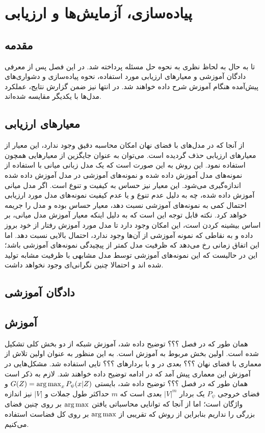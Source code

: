 \chapter{پیاده‌سازی، آزمایش‌ها و ارزیابی}\label{Chap:Chap4}
\minitoc
\section{مقدمه}
تا به حال به لحاظ نظری به نحوه حل مسئله پرداخته شد. در این فصل پس از معرفی دادگان آموزشی و معیارهای ارزیابی مورد استفاده، نحوه پیاده‌سازی و دشواری‌های پیش‌آمده هنگام آموزش شرح داده خواهند شد. در انتها نیز ضمن گزارش نتایج، عملکرد مدل‌ها با یکدیگر مقایسه شده‌اند.
\section{معیارهای ارزیابی}
از آنجا که در مدل‌های با فضای نهان امکان محاسبه دقیق \likelihood{} وجود ندارد، این معیار از معیارهای ارزیابی حذف گردیده است. می‌توان به عنوان جایگزین از معیارهایی همچون \revperplexity{} استفاده نمود. این روش به این صورت است که یک مدل زبانی میانی با استفاده از نمونه‌های مدل آموزش داده شده و \likelihood{} نمونه‌های آموزشی در مدل آموزش داده شده اندازه‌گیری می‌شود. این معیار نیز حساس به کیفیت و تنوع است. اگر مدل میانی آموزش داده شده، چه به دلیل عدم تنوع  و یا عدم کیفیت نمونه‌های مدل مورد ارزیابی احتمال کمی به نمونه‌های آموزشی نسبت دهد، معیار حساس بوده و مدل را جریمه خواهد کرد. نکته قابل توجه این است که به دلیل اینکه معیار آموزش مدل میانی، بر اساس بیشینه کردن \likelihood{} است، این امکان وجود دارد تا مدل مورد آموزش رفتار \meanseeking{} از خود بروز داده و به نقاطی که نمونه آموزشی از آن‌ها وجود ندارد، احتمال بالایی نسبت دهد. اما این اتفاق زمانی رخ می‌دهد که ظرفیت مدل کمتر از پیچیدگی نمونه‌های آموزشی باشد؛ این در حالیست که این نمونه‌های آموزشی توسط مدل مشابهی با ظرفیت مشابه تولید شده اند و احتمالا چنین نگرانی‌ای وجود نخواهد داشت.
\section{دادگان آموزشی}
\section{آموزش \wae{}}
همان طور که در فصل ؟؟؟ توضیح داده شد، آموزش شبکه از دو بخش کلی تشکیل شده است. اولین بخش مربوط به آموزش \wae{} است. به این منظور به عنوان اولین تلاش از معماری  با فضای نهان ؟؟؟ بعدی در \encoder{} و \decoder{} با بردارهای  \embedding{} ؟؟؟ تایی استفاده شد. مشکل‌هایی در آموزش این معماری پیش آمد که در ادامه توضیح داده خواهند شد. لازم به ذکر است همان طور که در فصل ؟؟؟ توضیح داده شد، \decoder{} بایستی 
$G(Z) = \operatorname*{arg\,max}_{x} P_\psi(x|Z)$
و فضای خروجی $P_\psi$ یک بردار $|V|^{m}$ بعدی است که $m$ حداکثر طول جملات و $|V|$ نیز اندازه واژگان است؛ اما از آنجا که توانایی محاسباتی یافتن $\operatorname*{arg\,max}$ بر روی چنین فضای بزرگی را نداریم بنابراین از روش 
که تقریبی از $\operatorname*{arg\,max}$ بر روی کل فضاست استفاده می‌کنیم.
\iffalse
